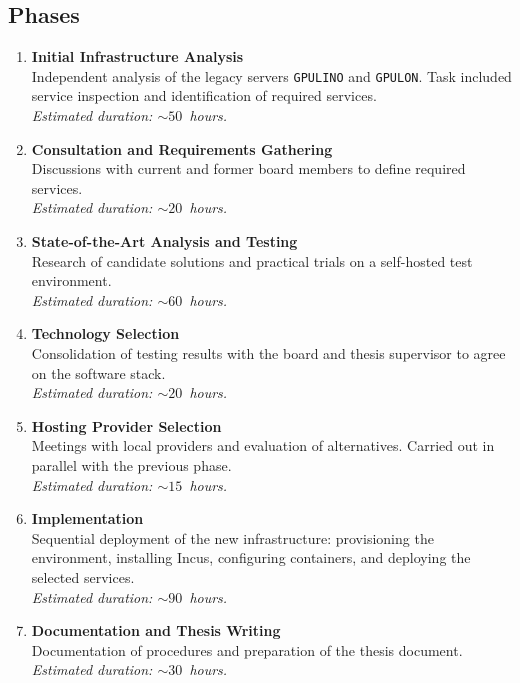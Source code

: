 \subsection*{Phases}

\begin{enumerate}
  \item \textbf{Initial Infrastructure Analysis}\\
  Independent analysis of the legacy servers \texttt{GPULINO} and \texttt{GPULON}. Task included service inspection and identification of required services.\\
  \emph{Estimated duration: \(\sim 50\)~hours.}

  \item \textbf{Consultation and Requirements Gathering}\\
  Discussions with current and former board members to define required services.\\
  \emph{Estimated duration: \(\sim 20\)~hours.}

  \item \textbf{State-of-the-Art Analysis and Testing}\\
  Research of candidate solutions and practical trials on a self-hosted test environment.\\
  \emph{Estimated duration: \(\sim 60\)~hours.}

  \item \textbf{Technology Selection}\\
  Consolidation of testing results with the board and thesis supervisor to agree on the software stack.\\
  \emph{Estimated duration: \(\sim 20\)~hours.}

  \item \textbf{Hosting Provider Selection}\\
  Meetings with local providers and evaluation of alternatives. Carried out in parallel with the previous phase.\\
  \emph{Estimated duration: \(\sim 15\)~hours.}

  \item \textbf{Implementation}\\
  Sequential deployment of the new infrastructure: provisioning the environment, installing Incus, configuring containers, and deploying the selected services.\\
  \emph{Estimated duration: \(\sim 90\)~hours.}

  \item \textbf{Documentation and Thesis Writing}\\
  Documentation of procedures and preparation of the thesis document.\\
  \emph{Estimated duration: \(\sim 30\)~hours.}

\end{enumerate}

